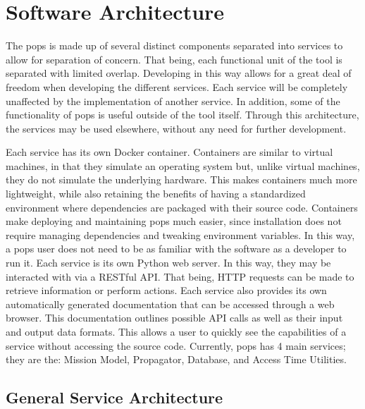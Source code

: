 \glsresetall{} 

\chapter{Software Architecture}\label{chap:architecture}

\lettrine[lines=2, findent=0pt, nindent=5pt]{T}{}he \gls{pops} is made up of
several distinct components separated into services to allow for separation of
concern. That being, each functional unit of the tool is separated with limited
overlap. Developing in this way allows for a great deal of freedom when
developing the different services. Each service will be completely
unaffected by the implementation of another service. In addition, some of the
functionality of \gls{pops} is useful outside of the tool itself. Through this
architecture, the services may be used elsewhere, without any need for further
development.  

Each service has its own Docker container. Containers are similar to virtual
machines, in that they simulate an operating system but, unlike virtual
machines, they do not simulate the underlying hardware. This makes containers
much more lightweight, while also retaining the benefits of having a
standardized environment where dependencies are packaged with their source
code. Containers make deploying and maintaining \gls{pops} much easier, since
installation does not require managing dependencies and tweaking environment
variables. In this way, a \gls{pops} user does not need to be as familiar with
the software as a developer to run it.  Each service is its own Python web
server. In this way, they may be interacted with via a RESTful API. That being,
HTTP requests can be made to retrieve information or perform actions. Each
service also provides its own automatically generated documentation that can be
accessed through a web browser. This documentation outlines possible API calls
as well as their input and output data formats.  This allows a user to quickly
see the capabilities of a service without accessing the source code. Currently,
\gls{pops} has 4 main services; they are the: Mission Model, Propagator,
Database, and Access Time Utilities.


\section{General Service Architecture}

